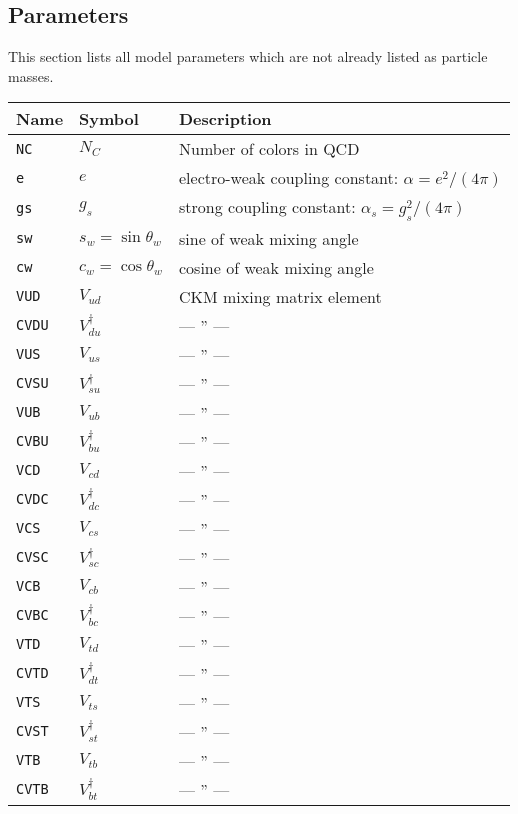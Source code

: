 \subsection{Parameters}
This section lists all model parameters which are not already
listed as particle masses.

\medskip
\begin{longtable}{|l|l|l|}
\hline
Name & Symbol & Description\\
\hline
\texttt{NC }& $N_C$ & Number of colors in QCD\\
\texttt{e }& $e$ & electro-weak coupling constant: $\alpha=e^2/(4\pi)$\\
\texttt{gs }& $g_s$ & strong coupling constant: $\alpha_s=g_s^2/(4\pi)$\\
\texttt{sw }& $s_w=\sin\theta_w$ & sine of weak mixing angle\\
\texttt{cw }& $c_w=\cos\theta_w$ & cosine of weak mixing angle\\
\texttt{VUD }& $V_{ud}$ & CKM mixing matrix element\\
\texttt{CVDU }& $V_{du}^{\dagger}$ & --- '' ---\\
\texttt{VUS }& $V_{us}$ & --- '' ---\\
\texttt{CVSU }& $V_{su}^{\dagger}$ & --- '' ---\\
\texttt{VUB }& $V_{ub}$ & --- '' ---\\
\texttt{CVBU }& $V_{bu}^{\dagger}$ & --- '' ---\\
\texttt{VCD }& $V_{cd}$ & --- '' ---\\
\texttt{CVDC }& $V_{dc}^{\dagger}$ & --- '' ---\\
\texttt{VCS }& $V_{cs}$ & --- '' ---\\
\texttt{CVSC }& $V_{sc}^{\dagger}$ & --- '' ---\\
\texttt{VCB }& $V_{cb}$ & --- '' ---\\
\texttt{CVBC }& $V_{bc}^{\dagger}$ & --- '' ---\\
\texttt{VTD }& $V_{td}$ & --- '' ---\\
\texttt{CVTD }& $V_{dt}^{\dagger}$ & --- '' ---\\
\texttt{VTS }& $V_{ts}$ & --- '' ---\\
\texttt{CVST }& $V_{st}^{\dagger}$ & --- '' ---\\
\texttt{VTB }& $V_{tb}$ & --- '' ---\\
\texttt{CVTB }& $V_{bt}^{\dagger}$ & --- '' ---\\
\hline
\end{longtable}
\renewcommand{\arraystretch}{1.25}
